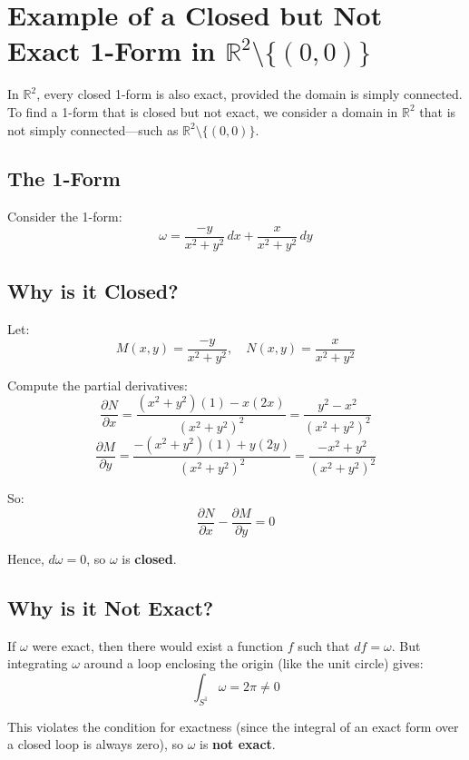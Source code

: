 \documentclass{article}
\begin{document}
	
	\section*{Example of a Closed but Not Exact 1-Form in \(\mathbb{R}^2 \setminus \{(0,0)\}\)}
	
	In \(\mathbb{R}^2\), every closed 1-form is also exact, provided the domain is simply connected. To find a 1-form that is closed but not exact, we consider a domain in \(\mathbb{R}^2\) that is not simply connected—such as \(\mathbb{R}^2 \setminus \{(0,0)\}\).
	
	\subsection*{The 1-Form}
	Consider the 1-form:
	\[
	\omega = \frac{-y}{x^2 + y^2} \, dx + \frac{x}{x^2 + y^2} \, dy
	\]
	
	\subsection*{Why is it Closed?}
	Let:
	\[
	M(x, y) = \frac{-y}{x^2 + y^2}, \quad N(x, y) = \frac{x}{x^2 + y^2}
	\]
	
	Compute the partial derivatives:
	\[
	\frac{\partial N}{\partial x} = \frac{(x^2 + y^2)(1) - x(2x)}{(x^2 + y^2)^2} = \frac{y^2 - x^2}{(x^2 + y^2)^2}
	\]
	\[
	\frac{\partial M}{\partial y} = \frac{-(x^2 + y^2)(1) + y(2y)}{(x^2 + y^2)^2} = \frac{-x^2 + y^2}{(x^2 + y^2)^2}
	\]
	
	So:
	\[
	\frac{\partial N}{\partial x} - \frac{\partial M}{\partial y} = 0
	\]
	
	Hence, \( d\omega = 0 \), so \( \omega \) is \textbf{closed}.
	
	\subsection*{Why is it Not Exact?}
	If \( \omega \) were exact, then there would exist a function \( f \) such that \( df = \omega \). But integrating \( \omega \) around a loop enclosing the origin (like the unit circle) gives:
	\[
	\int_{S^1} \omega = 2\pi \neq 0
	\]
	
	This violates the condition for exactness (since the integral of an exact form over a closed loop is always zero), so \( \omega \) is \textbf{not exact}.
	
\end{document}
